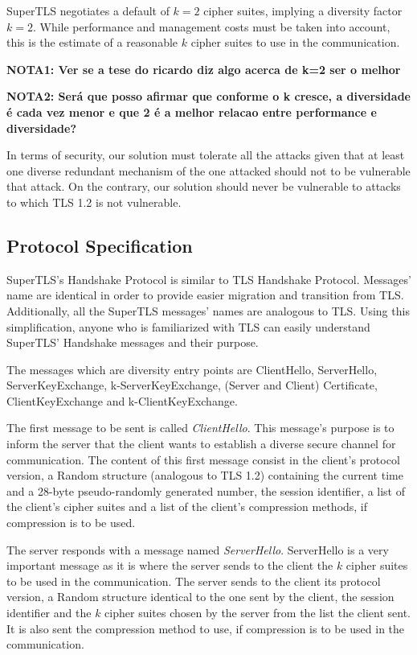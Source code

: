 \documentclass{sig-alternate-05-2015}
\begin{document}
SuperTLS negotiates a default of $k = 2$ cipher suites, implying a diversity factor $k = 2$. While performance and management costs must be taken into account, this is the estimate of a reasonable $k$ cipher suites to use in the communication.

\textbf{NOTA1: Ver se a tese do ricardo diz algo acerca de k=2 ser o melhor}

\textbf{NOTA2: Ser\'a que posso afirmar que conforme o k cresce, a diversidade \'e cada vez menor e que 2 \'e a melhor relacao entre performance e diversidade?}

In terms of security, our solution must tolerate all the attacks given that at least one diverse redundant mechanism of the one attacked should not to be vulnerable that attack. On the contrary, our solution should never be vulnerable to attacks to which TLS 1.2 is not vulnerable.

\subsection{Protocol Specification}

SuperTLS's Handshake Protocol is similar to TLS Handshake Protocol. Messages' name are identical in order to provide easier migration and transition from TLS. Additionally, all the SuperTLS messages' names are analogous to TLS. Using this simplification, anyone who is familiarized with TLS can easily understand SuperTLS' Handshake messages and their purpose.

The messages which are diversity entry points are ClientHello, ServerHello, ServerKeyExchange, k-ServerKeyExchange, (Server and Client) Certificate, ClientKeyExchange and k-ClientKeyExchange.

The first message to be sent is called \textit{ClientHello}. This message's purpose is to inform the server that the client wants to establish a diverse secure channel for communication. The content of this first message consist in the client's protocol version, a Random structure (analogous to TLS 1.2) containing the current time and a 28-byte pseudo-randomly generated number, the session identifier, a list of the client's cipher suites and a list of the client's compression methods, if compression is to be used.

The server responds with a message named \textit{ServerHello}. ServerHello is a very important message as it is where the server sends to the client the $k$ cipher suites to be used in the communication. The server sends to the client its protocol version, a Random structure identical to the one sent by the client, the session identifier and the $k$ cipher suites chosen by the server from the list the client sent. It is also sent the compression method to use, if compression is to be used in the communication.
\end{document}
